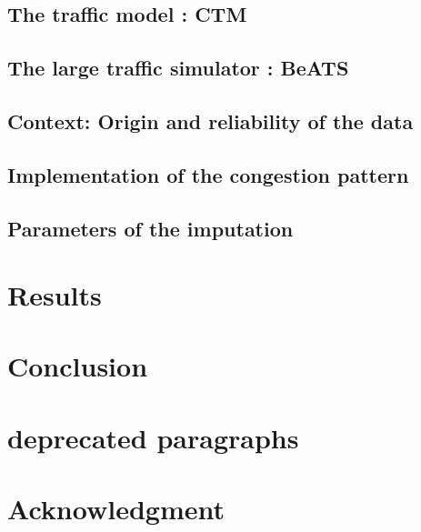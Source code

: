 \subsection{The traffic model : CTM}
\label{ctm}

\subsection{The large traffic simulator : BeATS}
\label{subsec:beats}

\subsection{Context: Origin and reliability of the data}
\label{subsec:pems}

\subsection{Implementation of the congestion pattern}
\label{subsec:cpimplementation}




\subsection{Parameters of the imputation}
\label{subsec:parameters}







\section{Results}
\label{sec:results}


\section{Conclusion}


\section{deprecated paragraphs}


\section*{Acknowledgment}



\label{sec:appendix}






%

